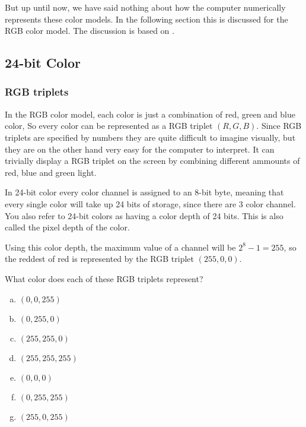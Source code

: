 But up until now, we have said nothing about how the computer
numerically represents these color models. In the following section
this is discussed for the RGB color model. The discussion is based on
\cite{murray1996encyclopedia,neider93:_openg_progr_guide,niederst1999webdesign,sitts2000handbook}.

\subsection{24-bit Color}
\label{sec:24-bit-color}

\subsubsection{RGB triplets}


In the RGB color model, each color is just a combination of red, green
and blue color, So every color can be represented as a RGB triplet
$(R, G, B)$. Since RGB triplets are specified by numbers they are
quite difficult to imagine visually, but they are on the other hand
very easy for the computer to interpret. It can trivially display a
RGB triplet on the screen by combining different ammounts of red, blue
and green light.

In 24-bit color every color channel is assigned to an 8-bit byte,
meaning that every single color will take up 24 bits of storage, since
there are $3$ color channel. You also refer to 24-bit colors as having
a color depth of 24 bits. This is also called the pixel
depth of the color.

Using this color depth, the maximum value of a channel will be $2^8 -
1 = 255$, so the reddest of red is represented by the RGB triplet
$(255,0,0)$.

\begin{Exercise}[label={rgb-triplet}]
  What color does each of these RGB triplets represent?

  \begin{enumerate}[(a)]
  \item $(0,0,255)$
  \item $(0, 255, 0)$
  \item $(255,255,0)$
  \item $(255,255,255)$
  \item $(0,0,0)$
  \item $(0,255,255)$
  \item $(255,0,255)$

  \end{enumerate}
\end{Exercise}

